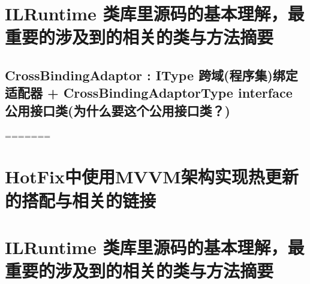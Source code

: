 \documentclass[9pt, b5paper]{article}
\begin{document}
\section{ILRuntime 类库里源码的基本理解，最重要的涉及到的相关的类与方法摘要}
\label{sec-13}
\subsection{CrossBindingAdaptor : IType 跨域(程序集)绑定适配器 + CrossBindingAdaptorType interface 公用接口类(为什么要这个公用接口类？)}
\label{sec-13-1}
=======
\section{HotFix中使用MVVM架构实现热更新的搭配与相关的链接}
\label{sec-10}

\section{ILRuntime 类库里源码的基本理解，最重要的涉及到的相关的类与方法摘要}
\label{sec-11}
\end{document}
